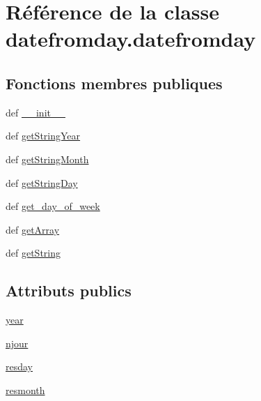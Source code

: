 \hypertarget{classdatefromday_1_1datefromday}{\section{Référence de la classe datefromday.\-datefromday}
\label{classdatefromday_1_1datefromday}
}
\subsection*{Fonctions membres publiques}
\begin{DoxyCompactItemize}
\item 
def \hyperlink{classdatefromday_1_1datefromday_aa54010cbbfea33d558a09ee90b3b5306}{\-\_\-\-\_\-init\-\_\-\-\_\-}
\item 
def \hyperlink{classdatefromday_1_1datefromday_ad0f9a3b9f4fdf0d8c005a19772498c95}{get\-String\-Year}
\item 
def \hyperlink{classdatefromday_1_1datefromday_a6e85aa539dc264d7fb2d3b37788bce7b}{get\-String\-Month}
\item 
def \hyperlink{classdatefromday_1_1datefromday_a8e7d4bebfddba74880919c58d5633d15}{get\-String\-Day}
\item 
def \hyperlink{classdatefromday_1_1datefromday_a8c72473924a49d1d975edb18f73d877b}{get\-\_\-day\-\_\-of\-\_\-week}
\item 
def \hyperlink{classdatefromday_1_1datefromday_a2a686f37ac2d71546d926c2188823b1c}{get\-Array}
\item 
def \hyperlink{classdatefromday_1_1datefromday_a2d0334466197d676daa1c25d61b529c2}{get\-String}
\end{DoxyCompactItemize}
\subsection*{Attributs publics}
\begin{DoxyCompactItemize}
\item 
\hyperlink{classdatefromday_1_1datefromday_a705eb03010097a53a5813aedb360ee30}{year}
\item 
\hyperlink{classdatefromday_1_1datefromday_a4f9694b8f18756495c1d79fdb6967350}{njour}
\item 
\hyperlink{classdatefromday_1_1datefromday_a82528e422e7b12f870894efafa9677db}{resday}
\item 
\hyperlink{classdatefromday_1_1datefromday_ac29c28e89d058d5a9c175c74ba604e8d}{resmonth}
\end{DoxyCompactItemize}
